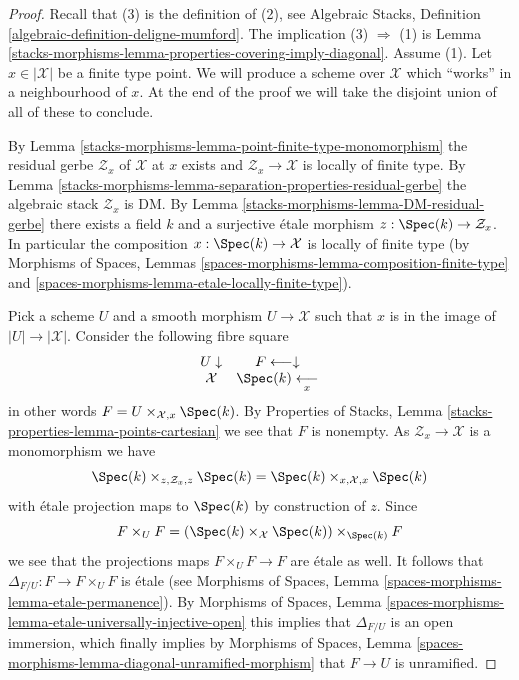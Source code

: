 \begin{proof}
Recall that (3) is the definition of (2), see
Algebraic Stacks, Definition \ref{algebraic-definition-deligne-mumford}.
The implication (3) $\Rightarrow$ (1) is
Lemma \ref{stacks-morphisms-lemma-properties-covering-imply-diagonal}.
Assume (1). Let $x \in |\mathcal{X}|$ be a finite type point.
We will produce a scheme over $\mathcal{X}$ which ``works'' in a
neighbourhood of $x$. At the end of the proof we will take the disjoint
union of all of these to conclude.

\medskip\noindent
By
Lemma \ref{stacks-morphisms-lemma-point-finite-type-monomorphism}
the residual gerbe $\mathcal{Z}_x$ of $\mathcal{X}$ at $x$ exists and
$\mathcal{Z}_x \to \mathcal{X}$ is locally of finite type. By
Lemma \ref{stacks-morphisms-lemma-separation-properties-residual-gerbe}
the algebraic stack $\mathcal{Z}_x$ is DM. By
Lemma \ref{stacks-morphisms-lemma-DM-residual-gerbe}
there exists a field $k$ and a surjective \'etale morphism
$z : \Spec(k) \to \mathcal{Z}_x$.
In particular the composition $x : \Spec(k) \to \mathcal{X}$
is locally of finite type (by
Morphisms of Spaces, Lemmas
\ref{spaces-morphisms-lemma-composition-finite-type} and
\ref{spaces-morphisms-lemma-etale-locally-finite-type}).

\medskip\noindent
Pick a scheme $U$ and a smooth morphism $U \to \mathcal{X}$ such that
$x$ is in the image of $|U| \to |\mathcal{X}|$.
Consider the following fibre square
$$
\begin{array}{cc}U \downarrow & F  \longleftarrow\downarrow \\ \mathcal{X} & \Spec(k) \underset{x}{\longleftarrow}\end{array}
$$
in other words $F = U \times_{\mathcal{X}, x} \Spec(k)$. By
Properties of Stacks, Lemma \ref{stacks-properties-lemma-points-cartesian}
we see that $F$ is nonempty.
As $\mathcal{Z}_x \to \mathcal{X}$ is a monomorphism we have
$$
\Spec(k) \times_{z, \mathcal{Z}_x, z} \Spec(k)
=
\Spec(k) \times_{x, \mathcal{X}, x} \Spec(k)
$$
with \'etale projection maps to $\Spec(k)$ by construction of $z$.
Since
$$
F \times_U F =
(\Spec(k) \times_\mathcal{X} \Spec(k))
\times_{\Spec(k)} F
$$
we see that the projections maps $F \times_U F \to F$ are \'etale as well.
It follows that $\Delta_{F/U} : F \to F \times_U F$ is \'etale (see
Morphisms of Spaces, Lemma \ref{spaces-morphisms-lemma-etale-permanence}).
By
Morphisms of Spaces, Lemma
\ref{spaces-morphisms-lemma-etale-universally-injective-open}
this implies that $\Delta_{F/U}$ is an open immersion, which finally
implies by
Morphisms of Spaces, Lemma
\ref{spaces-morphisms-lemma-diagonal-unramified-morphism}
that $F \to U$ is unramified.


\end{proof}
